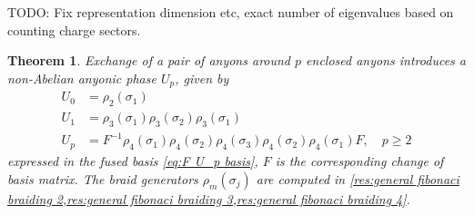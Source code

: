 \documentclass[a4paper,10pt,oneside]{book}
\theoremstyle{plain}
\newtheorem{theorem}{Theorem}[section]
\theoremstyle{definition}
\theoremstyle{remark}
\begin{document}
TODO: Fix representation dimension etc, exact number of eigenvalues based on counting charge sectors.

\begin{theorem}\label{thm:fibonacci U_p}
  Exchange of a pair of anyons around $p$ enclosed anyons introduces a non-Abelian anyonic phase $U_p$, given by
  \begin{align*}
    U_0 &= ρ_2(σ_1) \\
    U_1 &= ρ_3(σ_1) ρ_3(σ_2) ρ_3(σ_1) \\
    U_p &= F^{-1} ρ_4(σ_1) ρ_4(σ_2) ρ_4(σ_3) ρ_4(σ_2) ρ_4(σ_1) F, \quad p \ge 2
  \end{align*}
  expressed in the fused basis \cref{eq:F U_p basis}, $F$ is the corresponding change of basis matrix. The braid generators $ρ_m(σ_j)$ are computed in \cref{res:general fibonaci braiding 2,res:general fibonaci braiding 3,res:general fibonaci braiding 4}.

\end{theorem}
\end{document}
